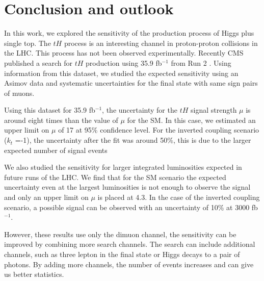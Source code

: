 
\chapter{Conclusion and outlook}
In this work, we explored the sensitivity of the production process of Higgs plus single top.
The $tH$ process is an interesting channel in proton-proton collisions in the LHC. This process has not been observed experimentally. Recently CMS published a search for $tH$ production using 35.9 fb$^{-1}$ from Run 2 . Using information from this dataset, we studied the expected sensitivity using an Asimov data and systematic uncertainties for the final state with same sign pairs of muons. 

Using this dataset for 35.9 fb$^{-1}$, the uncertainty for the $tH$ signal strength $\mu$ is around eight times than the value of $\mu$ for the SM. In this case, we estimated an upper limit on $\mu$ of 17 at 95$\%$ confidence level. 
For the inverted coupling scenario ($k_t$ =-1), the uncertainty after the fit was around 50$\%$, this is due to the larger expected number of signal events

We also studied the sensitivity for larger integrated luminosities expected in future runs of the LHC. We find that for the SM scenario the expected uncertainty even at the largest luminosities is not enough to observe the signal and only an upper limit on $\mu$ is placed at 4.3. In the case of the inverted coupling scenario, a possible signal can be observed with an uncertainty of 10$\%$ at 3000 fb$^{-1}$.

However, these results use only the dimuon channel, the sensitivity can be improved by combining more search channels. The search can include additional channels, such as three lepton in the final state or Higgs decays to a pair of photons. By adding more channels, the number of events increases and can give us better statistics. 




